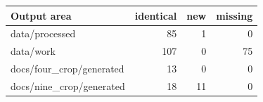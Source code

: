 \begin{tabular}{lrrr}
\toprule
Output area & identical & new & missing \\
\midrule
data/processed & 85 & 1 & 0 \\
data/work & 107 & 0 & 75 \\
docs/four\_crop/generated & 13 & 0 & 0 \\
docs/nine\_crop/generated & 18 & 11 & 0 \\
\bottomrule
\end{tabular}
